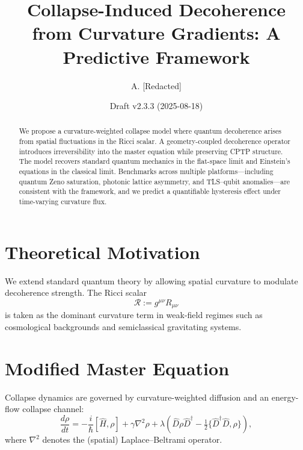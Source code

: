 \documentclass[aps,prl,twocolumn,nofootinbib]{revtex4-2}
\begin{document}
\title{Collapse-Induced Decoherence from Curvature Gradients: A Predictive Framework}
\author{A. [Redacted]}
\date{Draft v2.3.3 (2025-08-18)}

\begin{abstract}
We propose a curvature-weighted collapse model where quantum decoherence arises from spatial fluctuations in the Ricci scalar. A geometry-coupled decoherence operator introduces irreversibility into the master equation while preserving CPTP structure. The model recovers standard quantum mechanics in the flat-space limit and Einstein’s equations in the classical limit. Benchmarks across multiple platforms---including quantum Zeno saturation, photonic lattice asymmetry, and TLS--qubit anomalies---are consistent with the framework, and we predict a quantifiable hysteresis effect under time-varying curvature flux.
\end{abstract}

\maketitle

\section{Theoretical Motivation}

We extend standard quantum theory by allowing spatial curvature to modulate decoherence strength. The Ricci scalar
\begin{equation}
\mathcal{R} := g^{\mu\nu} R_{\mu\nu}
\end{equation}
is taken as the dominant curvature term in weak-field regimes such as cosmological backgrounds and semiclassical gravitating systems.

\section{Modified Master Equation}

Collapse dynamics are governed by curvature-weighted diffusion and an energy-flow collapse channel:
\begin{equation}
\frac{d\rho}{dt} = -\frac{i}{\hbar}[\hat{H},\rho]
+ \gamma \nabla^2\rho
+ \lambda\!\left(\hat{D}\rho\hat{D}^\dagger - \tfrac{1}{2}\{\hat{D}^\dagger\hat{D},\rho\}\right),
\end{equation}
where $\nabla^2$ denotes the (spatial) Laplace--Beltrami operator.
\end{document}
